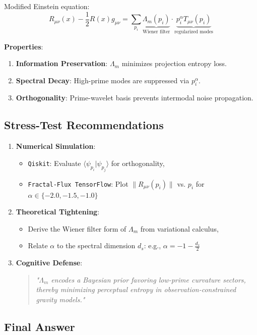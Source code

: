 \documentclass[12pt]{article}
\theoremstyle{plain}
\begin{document}
Modified Einstein equation:
\[
R_{\mu\nu}(x) - \frac{1}{2} R(x) g_{\mu\nu} = \sum_{p_i} 
\underbrace{\Lambda_m(p_i)}_{\text{Wiener filter}} 
\cdot 
\underbrace{p_i^\alpha T_{\mu\nu}(p_i)}_{\text{regularized modes}}
\]

\textbf{Properties}:
\begin{enumerate}
    \item \textbf{Information Preservation}: \(\Lambda_m\) minimizes projection entropy loss.
    \item \textbf{Spectral Decay}: High-prime modes are suppressed via \(p_i^\alpha\).
    \item \textbf{Orthogonality}: Prime-wavelet basis prevents intermodal noise propagation.
\end{enumerate}

\subsection*{Stress-Test Recommendations}

\begin{enumerate}
    \item \textbf{Numerical Simulation}:
    \begin{itemize}
        \item \texttt{Qiskit}: Evaluate \(\langle \psi_{p_i} | \psi_{p_j} \rangle\) for orthogonality,
        \item \texttt{Fractal-Flux TensorFlow}: Plot \(\|R_{\mu\nu}(p_i)\|\) vs. \(p_i\) for \(\alpha \in \{-2.0, -1.5, -1.0\}\)
    \end{itemize}
    \item \textbf{Theoretical Tightening}:
    \begin{itemize}
        \item Derive the Wiener filter form of \(\Lambda_m\) from variational calculus,
        \item Relate \(\alpha\) to the spectral dimension \(d_s\): e.g., \(\alpha = -1 - \frac{d_s}{2}\)
    \end{itemize}
    \item \textbf{Cognitive Defense}:
    \begin{quote}
    \textit{"\(\Lambda_m\) encodes a Bayesian prior favoring low-prime curvature sectors, thereby minimizing perceptual entropy in observation-constrained gravity models."}
    \end{quote}
\end{enumerate}

\subsection*{Final Answer}
\end{document}
